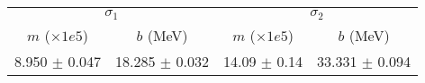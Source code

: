 \begin{tabular}{cc|cc}
\multicolumn{2}{c|}{$\sigma_1$} & \multicolumn{2}{|c}{$\sigma_2$} \\
$m$ ($\times1e5$) & $b$ (MeV) & $m$ ($\times1e5$) & $b$ (MeV) \\
\hline
8.950 $\pm$ 0.047 & 18.285 $\pm$ 0.032 & 14.09 $\pm$ 0.14 & 33.331 $\pm$ 0.094\\
\end{tabular}
